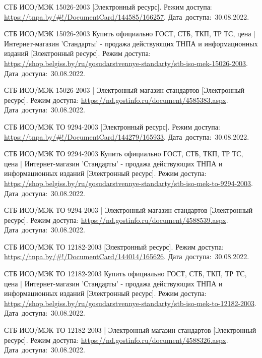 \begin{thebibliography}{}
  СТБ ИСО/МЭК 15026-2003
  [Электронный ресурс].
  Режим доступа: \url{https://tnpa.by/#!/DocumentCard/144585/166257}.
  Дата~доступа:~30.08.2022.

  СТБ ИСО/МЭК 15026-2003 Купить официально ГОСТ, СТБ, ТКП, ТР ТС, цена | Интернет-магазин 'Стандарты' - продажа действующих ТНПА и информационных изданий
  [Электронный ресурс].
  Режим доступа: \url{https://shop.belgiss.by/ru/gosudarstvennye-standarty/stb-iso-mek-15026-2003}.
  Дата~доступа:~30.08.2022.

  СТБ ИСО/МЭК 15026-2003 | Электронный магазин стандартов
  [Электронный ресурс].
  Режим доступа: \url{https://nd.gostinfo.ru/document/4585383.aspx}.
  Дата~доступа:~30.08.2022.



  СТБ ИСО/МЭК ТО 9294-2003
  [Электронный ресурс].
  Режим доступа: \url{https://tnpa.by/#!/DocumentCard/144279/165933}.
  Дата~доступа:~30.08.2022.

  СТБ ИСО/МЭК ТО 9294-2003 Купить официально ГОСТ, СТБ, ТКП, ТР ТС, цена | Интернет-магазин 'Стандарты' - продажа действующих ТНПА и информационных изданий
  [Электронный ресурс].
  Режим доступа: \url{https://shop.belgiss.by/ru/gosudarstvennye-standarty/stb-iso-mek-to-9294-2003}.
  Дата~доступа:~30.08.2022.

  СТБ ИСО/МЭК ТО 9294-2003 | Электронный магазин стандартов
  [Электронный ресурс].
  Режим доступа: \url{https://nd.gostinfo.ru/document/4588539.aspx}.
  Дата~доступа:~30.08.2022.



  СТБ ИСО/МЭК ТО 12182-2003
  [Электронный ресурс].
  Режим доступа: \url{https://tnpa.by/#!/DocumentCard/144014/165626}.
  Дата~доступа:~30.08.2022.

  СТБ ИСО/МЭК ТО 12182-2003 Купить официально ГОСТ, СТБ, ТКП, ТР ТС, цена | Интернет-магазин 'Стандарты' - продажа действующих ТНПА и информационных изданий
  [Электронный ресурс].
  Режим доступа: \url{https://shop.belgiss.by/ru/gosudarstvennye-standarty/stb-iso-mek-to-12182-2003}.
  Дата~доступа:~30.08.2022.

  СТБ ИСО/МЭК ТО 12182-2003 | Электронный магазин стандартов
  [Электронный ресурс].
  Режим доступа: \url{https://nd.gostinfo.ru/document/4588326.aspx}.
  Дата~доступа:~30.08.2022.

\end{thebibliography}
